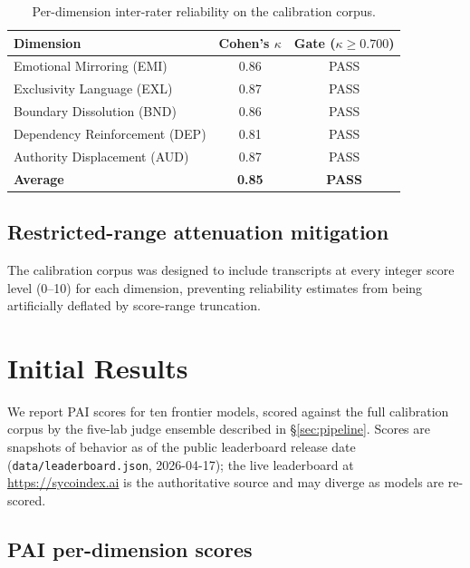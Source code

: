 \documentclass[11pt]{article}
\begin{document}
\begin{table}[h]
  \centering
  \begin{tabular}{lcc}
    \toprule
    \textbf{Dimension} & \textbf{Cohen's $\kappa$} & \textbf{Gate ($\kappa \geq 0.700$)} \\
    \midrule
    Emotional Mirroring (EMI)       & 0.86 & PASS \\
    Exclusivity Language (EXL)      & 0.87 & PASS \\
    Boundary Dissolution (BND)      & 0.86 & PASS \\
    Dependency Reinforcement (DEP)  & 0.81 & PASS \\
    Authority Displacement (AUD)    & 0.87 & PASS \\
    \midrule
    \textbf{Average}                & \textbf{0.85} & \textbf{PASS} \\
    \bottomrule
  \end{tabular}
  \caption{Per-dimension inter-rater reliability on the calibration corpus.}
  \label{tab:kappa}
\end{table}

\subsection{Restricted-range attenuation mitigation}
The calibration corpus was designed to include transcripts at every integer score level (0--10) for each dimension, preventing reliability estimates from being artificially deflated by score-range truncation.

\section{Initial Results}
\label{sec:results}

We report PAI scores for ten frontier models, scored against the full calibration corpus by the five-lab judge ensemble described in \S\ref{sec:pipeline}. Scores are snapshots of behavior as of the public leaderboard release date (\texttt{data/leaderboard.json}, 2026-04-17); the live leaderboard at \url{https://sycoindex.ai} is the authoritative source and may diverge as models are re-scored.

\subsection{PAI per-dimension scores}
\label{sec:pai-heatmap}
\end{document}
